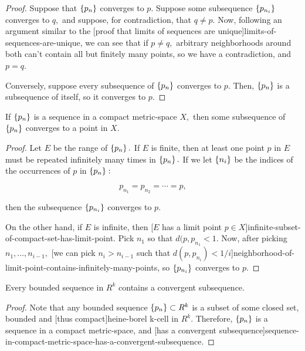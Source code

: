 \documentclass{article}
\begin{document}
\begin{proof}
Suppose that $\left\{ p_n \right\}$ \@{converges} to $p.$ Suppose some \@{subsequence} $\left\{ p_{n_i} \right\}$ converges to $q,$ and suppose, for contradiction, that $q \neq p.$ Now, following an argument similar to the \@[proof that limits of sequences are unique]{limits-of-sequences-are-unique}, we can see that if $p \neq q,$ arbitrary neighborhoods around both can't contain all but finitely many points, so we have a contradiction, and $p = q.$ 

Conversely, suppose every \@{subsequence} of $\left\{ p_n \right\}$ \@{converges} to $p.$ Then, $\left\{ p_n \right\}$ is a \@{subsequence} of itself, so it \@{converges} to $p.$
\end{proof}

\begin{theorem}\label{sequence-in-compact-metric-space-has-a-convergent-subsequence}
If $\left\{ p_n \right\}$ is a \@{sequence} in a \@{compact} \@{metric-space} $X,$ then some \@{subsequence} of $\left\{ p_n \right\}$ \@{converges} to a point in $X.$
\end{theorem}

\begin{proof}
Let $E$ be the range of $\left\{ p_n \right\}.$ If $E$ is \@{finite}, then at least one \@{point} $p$ in $E$ must be repeated infinitely many times in $\left\{ p_n \right\}.$ If we let $\left\{ n_i \right\}$ be the indices of the occurrences of $p$ in $\left\{ p_n \right\}:$

\[ p_{n_1} = p_{n_2} = \cdots = p, \]

then the \@{subsequence} $\left\{ p_{n_i} \right\}$ \@{converges} to $p.$

On the other hand, if $E$ is \@{infinite}, then \@[$E$ has a limit point $p \in X$]{infinite-subset-of-compact-set-has-limit-point}. Pick $n_1$ so that $d(p, p_{n_1} < 1.$ Now, after picking $n_1, \dots, n_{i -1},$ \@[we can pick $n_i > n_{i-1}$ such that $d(p, p_{n_i}) < 1/i$]{neighborhood-of-limit-point-contains-infinitely-many-points}, so $\left\{ p_{n_i} \right\}$ \@{converges} to $p.$
\end{proof}

\begin{theorem}
Every \@{bounded} \@{sequence} in $R^k$ contains a convergent \@{subsequence}.
\end{theorem}

\begin{proof}
Note that any \@{bounded} \@{sequence} $\left\{ p_n \right\} \subset R^k$ is a \@{subset} of some \@{closed} \@{set}, \@{bounded} and \@[thus compact]{heine-borel} \@{k-cell} in $R^k.$ Therefore, $\left\{ p_n \right\}$ is a \@{sequence} in a \@{compact} \@{metric-space}, and \@[has a convergent subsequence]{sequence-in-compact-metric-space-has-a-convergent-subsequence}.
\end{proof}
\end{document}
